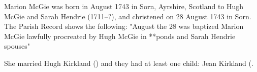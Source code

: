 
Marion McGie was born in August 1743 in	Sorn, Ayrshire, Scotland to Hugh McGie and Sarah Hendrie (1711--?), and christened on 28 August 1743 in	Sorn. The Parish Record shows the following:
 "August the 28 was baptized Marion McGie lawfully procreated by Hugh McGie in **ponds and Sarah Hendrie spouses" \cite{MMcGieBirth}
 
 She married Hugh Kirkland () and they had at least one child: Jean Kirkland (.

